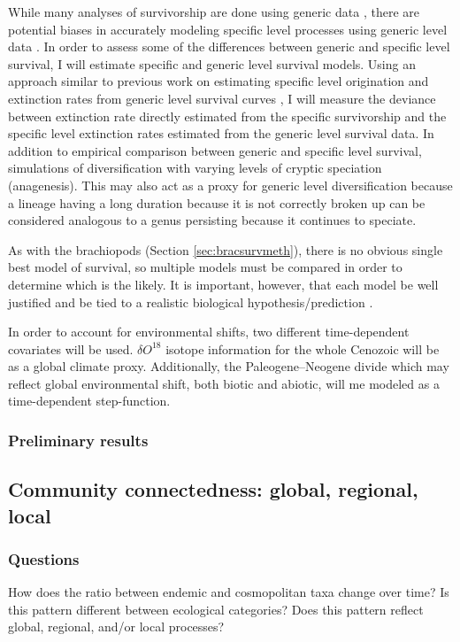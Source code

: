 \documentclass[12pt,letterpaper]{article}
\begin{document}
While many analyses of survivorship are done using generic data \citep{Tomiya2013,Liow2008,Harnik2013,Finnegan2008,Foote2006}, there are potential biases in accurately modeling specific level processes using generic level data \citep{Raup1975,Sepkoski1975,Simpson2006,Raup1991a,VanValen1979}. In order to assess some of the differences between generic and specific level survival, I will estimate specific and generic level survival models. Using an approach similar to previous work on estimating specific level origination and extinction rates from generic level survival curves \citep{Foote1988}, I will measure the deviance between extinction rate directly estimated from the specific survivorship and the specific level extinction rates estimated from the generic level survival data. In addition to empirical comparison between generic and specific level survival, simulations of diversification with varying levels of cryptic speciation (anagenesis). This may also act as a proxy for generic level diversification because a lineage having a long duration because it is not correctly broken up can be considered analogous to a genus persisting because it continues to speciate.

As with the brachiopods (Section \ref{sec:bracsurvmeth}), there is no obvious single best model of survival, so multiple models must be compared in order to determine which is the likely. It is important, however, that each model be well justified and be tied to a realistic biological hypothesis/prediction \citep{Burnham2002a}. 

In order to account for environmental shifts, two different time-dependent covariates will be used. \(\delta O^{18}\) isotope information for the whole Cenozoic \citep{Zachos2008} will be as a global climate proxy. Additionally, the Paleogene--Neogene divide which may reflect global environmental shift, both biotic and abiotic, will me modeled as a time-dependent step-function.

\subsubsection{Preliminary results}


\subsection{Community connectedness: global, regional, local} \label{sec:mamcom}

\subsubsection{Questions} \label{sec:mamcomques}
How does the ratio between endemic and cosmopolitan taxa change over time? Is this pattern different between ecological categories? Does this pattern reflect global, regional, and/or local processes? 
\end{document}
